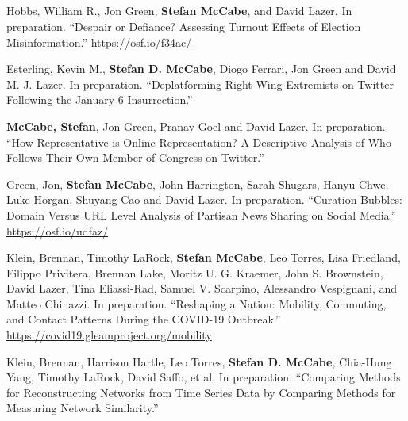 \documentclass[11pt, letter]{article}
\begin{document}
\subsection*{} %
\vspace{-6mm} %
\begin{hangparas}{.25in}{1}

Hobbs, William R., Jon Green, \textbf{Stefan McCabe}, and David Lazer. In
preparation. ``Despair or Defiance? Assessing Turnout Effects of Election
Misinformation.'' \href{https://osf.io/f34ac/}{https://osf.io/f34ac/}\vspace{2mm}

Esterling, Kevin M.,\textsuperscript{\textdagger} \textbf{Stefan D.
  McCabe},\textsuperscript{\textdagger} Diogo Ferrari, Jon Green and David M. J.
Lazer. In prep\-aration. ``Deplatforming Right-Wing Extremists on Twitter
Following the January 6 Insurrection.''\vspace{2mm}

\textbf{McCabe, Stefan}, Jon Green, Pranav Goel and David Lazer. In preparation.
``How Representative is Online Representation? A Descriptive Analysis of Who
Follows Their Own Member of Congress on Twitter.''\vspace{2mm}

Green, Jon,\textsuperscript{\textdagger} \textbf{Stefan
  McCabe},\textsuperscript{\textdagger} John Harrington, Sarah Shugars, Hanyu
Chwe, Luke Horgan, Shuyang Cao and David Lazer. In preparation. ``Curation
Bubbles: Domain Versus URL Level Analysis of Partisan News Sharing on Social
Media.'' \href{https://osf.io/udfaz/}{https://osf.io/udfaz/} \vspace{2mm}

Klein, Brennan,\textsuperscript{\textdagger} Timothy
LaRock,\textsuperscript{\textdagger} \textbf{Stefan
  McCabe},\textsuperscript{\textdagger} Leo Torres,\textsuperscript{\textdagger}
Lisa Friedland, Filippo Privitera, Brennan Lake, Moritz U. G. Kraemer, John S.
Brownstein, David Lazer, Tina Eliassi-Rad, Samuel V. Scarpino, Alessandro
Vespignani, and Matteo Chinazzi. In preparation. ``Reshaping a Nation: Mobility,
Commuting, and Contact Patterns During the COVID-19 Outbreak.''
\href{https://covid19.gleamproject.org/mobility}{https://covid19.gleamproject.org/mobility} \vspace{2mm}

Klein, Brennan, Harrison Hartle, Leo Torres, \textbf{Stefan D. McCabe},
Chia-Hung Yang, Timothy LaRock, David Saffo, et al. In preparation. ``Comparing
Methods for Reconstructing Networks from Time Series Data by Comparing Methods
for Measuring Network Similarity.'' \vspace{2mm}


\end{hangparas}
\end{document}
